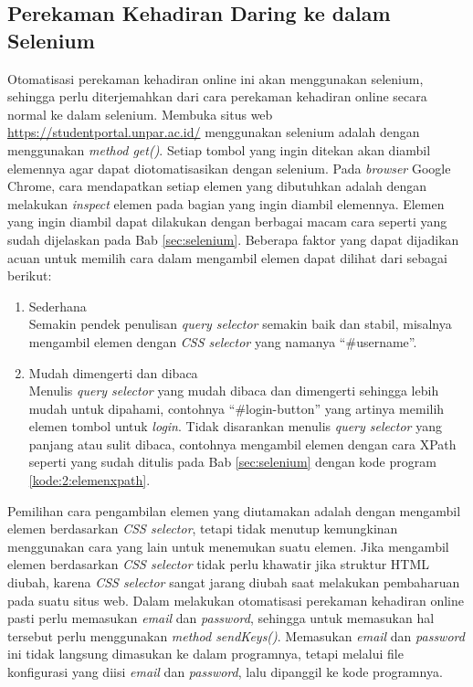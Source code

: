 \subsection{Perekaman Kehadiran Daring ke dalam Selenium}
\label{sec:terjemah} 
Otomatisasi perekaman kehadiran online ini akan menggunakan selenium, sehingga perlu diterjemahkan dari cara perekaman kehadiran online secara normal ke dalam selenium. Membuka situs web \url{https://studentportal.unpar.ac.id/} menggunakan selenium adalah dengan menggunakan \textit{method get()}. Setiap tombol yang ingin ditekan akan diambil elemennya agar dapat diotomatisasikan dengan selenium. Pada \textit{browser} Google Chrome, cara mendapatkan setiap elemen yang dibutuhkan adalah dengan melakukan \textit{inspect} elemen pada bagian yang ingin diambil elemennya. Elemen yang ingin diambil dapat dilakukan dengan berbagai macam cara seperti yang sudah dijelaskan pada Bab \ref{sec:selenium}. Beberapa faktor yang dapat dijadikan acuan untuk memilih cara dalam mengambil elemen dapat dilihat dari sebagai berikut:
\begin{enumerate}
	\item Sederhana \\
	Semakin pendek penulisan \textit{query selector} semakin baik dan stabil, misalnya mengambil elemen dengan \textit{CSS selector} yang namanya ``\#username''.
	\item Mudah dimengerti dan dibaca \\
	Menulis \textit{query selector} yang mudah dibaca dan dimengerti sehingga lebih mudah untuk dipahami, contohnya ``\#login-button'' yang artinya memilih elemen tombol untuk \textit{login}. Tidak disarankan menulis \textit{query selector} yang panjang atau sulit dibaca, contohnya mengambil elemen dengan cara XPath seperti yang sudah ditulis pada Bab \ref{sec:selenium} dengan kode program \ref{kode:2:elemenxpath}.
\end{enumerate}
Pemilihan cara pengambilan elemen yang diutamakan adalah dengan mengambil elemen berdasarkan \textit{CSS selector}, tetapi tidak menutup kemungkinan menggunakan cara yang lain untuk menemukan suatu elemen. Jika mengambil elemen berdasarkan \textit{CSS selector} tidak perlu khawatir jika struktur HTML diubah, karena \textit{CSS selector} sangat jarang diubah saat melakukan pembaharuan pada suatu situs web. 
Dalam melakukan otomatisasi perekaman kehadiran online pasti perlu memasukan \textit{email} dan \textit{password}, sehingga untuk memasukan hal tersebut perlu menggunakan \textit{method sendKeys()}. Memasukan \textit{email} dan \textit{password} ini tidak langsung dimasukan ke dalam programnya, tetapi melalui file konfigurasi yang diisi \textit{email} dan \textit{password}, lalu dipanggil ke kode programnya. 
